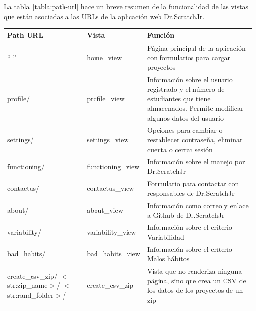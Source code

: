 \documentclass[a4paper, 12pt]{book}
\begin{document}
    \begin{table}[H]
     La tabla~\ref{tabla:path-url} hace un breve resumen de la funcionalidad de las vistas que están asociadas a las URLs de la aplicación web Dr.ScratchJr.
     \begin{center}
     \begin{tabular}{ | m{3.1cm} | m{3.3cm} | m{8.8cm} | }
      \hline \textbf{Path URL} & \textbf{Vista} & \textbf{Función}\\ \hline
    
        `` '' &
        home\_view &
        Página principal de la aplicación con formularios para cargar proyectos \\ \hline
        
        profile/ &
        profile\_view &
        Información sobre el usuario registrado y el número de estudiantes que tiene almacenados. Permite modificar algunos datos del usuario \\ \hline 
        
        settings/ &
        settings\_view &
        Opciones para cambiar o restablecer contraseña, eliminar cuenta o cerrar sesión \\ \hline
        
        functioning/ &
        functioning\_view &
        Información sobre el manejo por Dr.ScratchJr \\ \hline
        
        contactus/ &
        contactus\_view &
        Formulario para contactar con responsables de Dr.ScratchJr \\ \hline
        
        about/ &
        about\_view &
        Información como correo y enlace a Github de Dr.ScratchJr \\ \hline
        
        variability/ &
        variability\_view &
        Información sobre el criterio Variabilidad \\ \hline
        
        bad\_habits/ &
        bad\_habits\_view &
        Información sobre el criterio Malos hábitos \\ \hline
        
        create\_csv\_zip/ \newline $<$str:zip\_name$>$/ \newline $<$str:rand\_folder$>$/ &
        create\_csv\_zip &
        Vista que no renderiza ninguna página, sino que crea un CSV de los datos de los proyectos de un zip \\ \hline
        

\end{tabular}
\end{center}
\end{table}
\end{document}
